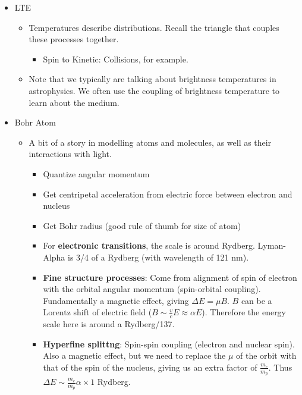 \documentclass{article}
\begin{document}
\begin{itemize}
    \item LTE
    \begin{itemize}
        \item Temperatures describe distributions. Recall the triangle that couples these processes together. 
        \begin{itemize}
            \item Spin to Kinetic: Collisions, for example. 
        \end{itemize}
        \item Note that we typically are talking about brightness temperatures in astrophysics. We often use the coupling of brightness temperature to learn about the medium. 
    \end{itemize}
    
    \item Bohr Atom
    \begin{itemize}
        \item A bit of a story in modelling atoms and molecules, as well as their interactions with light.
        \begin{itemize}
            \item Quantize angular momentum
            \item Get centripetal acceleration from electric force between electron and nucleus
            \item Get Bohr radius (good rule of thumb for size of atom)
            \item For \textbf{electronic transitions}, the scale is around Rydberg. Lyman-Alpha is 3/4 of a Rydberg (with wavelength of 121 nm). 
            \item \textbf{Fine structure processes}: Come from alignment of spin of electron with the orbital angular momentum (spin-orbital coupling). Fundamentally a magnetic effect, giving $\Delta E = \mu B$. $B$ can be a Lorentz shift of electric field ($B \sim \frac{v}{c} E \approx \alpha E$). Therefore the energy scale here is around a Rydberg/137.
            \item \textbf{Hyperfine splittng}: Spin-spin coupling (electron and nuclear spin). Also a magnetic effect, but we need to replace the $\mu$ of the orbit with that of the spin of the nucleus, giving us an extra factor of $\frac{m_e}{m_p}$. Thus $\Delta E \sim  \frac{m_e}{m_p} \alpha \times 1$ Rydberg. 
        \end{itemize}
    \end{itemize}
    

\end{itemize}
\end{document}
